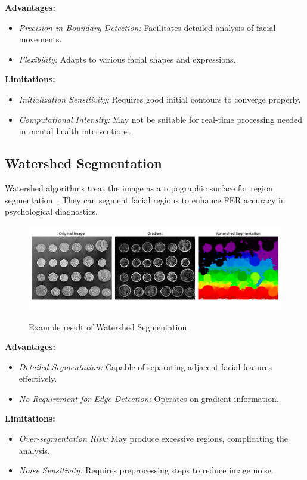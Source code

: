 \documentclass[lettersize,journal]{IEEEtran}
\begin{document}
\textbf{Advantages:}
\begin{itemize}
    \item \emph{Precision in Boundary Detection:} Facilitates detailed analysis of facial movements.
    \item \emph{Flexibility:} Adapts to various facial shapes and expressions.
\end{itemize}

\textbf{Limitations:}
\begin{itemize}
    \item \emph{Initialization Sensitivity:} Requires good initial contours to converge properly.
    \item \emph{Computational Intensity:} May not be suitable for real-time processing needed in mental health interventions.
\end{itemize}

\subsection{Watershed Segmentation}

Watershed algorithms treat the image as a topographic surface for region segmentation~\cite{Meyer1994}. They can segment facial regions to enhance FER accuracy in psychological diagnostics.
\begin{figure}[H]
    \centering
    \includegraphics[width=0.7\linewidth]{Traditional FER/Watershed Segmentation.png} \\
    
    \caption{Example result of Watershed Segmentation\cite{van2014scikit}}
    \label{fig:lbp_combined}
\end{figure}
\textbf{Advantages:}
\begin{itemize}
    \item \emph{Detailed Segmentation:} Capable of separating adjacent facial features effectively.
    \item \emph{No Requirement for Edge Detection:} Operates on gradient information.
\end{itemize}

\textbf{Limitations:}
\begin{itemize}
    \item \emph{Over-segmentation Risk:} May produce excessive regions, complicating the analysis.
    \item \emph{Noise Sensitivity:} Requires preprocessing steps to reduce image noise.
\end{itemize}
\end{document}

